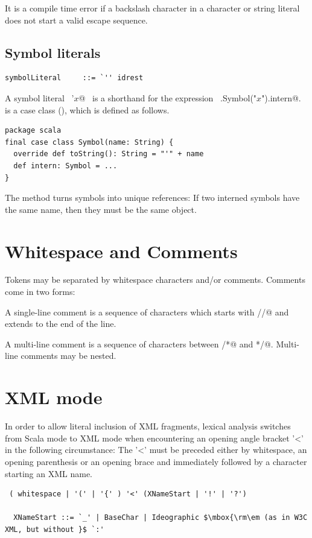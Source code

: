 It is a compile time error if a backslash character in a character or
string literal does not start a valid escape sequence.

\subsection{Symbol literals}

\syntax\begin{lstlisting}
symbolLiteral     ::= `'' idrest
\end{lstlisting}

A symbol literal ~\lstinline@'$x$@~ is a shorthand for the expression
~\lstinline@scala.Symbol("$x$").intern@. \lstinline@Symbol@ is a case class
(), which is defined as follows.
\begin{lstlisting}
package scala
final case class Symbol(name: String) {
  override def toString(): String = "'" + name
  def intern: Symbol = ...
}
\end{lstlisting}
The \lstinline@intern@ method turns symbols into unique references: If
two interned symbols have the same name, then they must be the same
object.

\section{Whitespace and Comments}

Tokens may be separated by whitespace characters
and/or comments. Comments come in two forms:

A single-line comment is a sequence of characters which starts with
\lstinline@//@ and extends to the end of the line.

A multi-line comment is a sequence of characters between \lstinline@/*@ and
\lstinline@*/@. Multi-line comments may be nested.

\section{XML mode\label{sec::xmlMode}}

In order to allow literal inclusion of XML fragments, lexical analysis
switches from Scala mode to XML mode when encountering an opening
angle bracket '<' in the following circumstance: The '<' must be
preceded either by whitespace, an opening parenthesis or an opening
brace and immediately followed by a character starting an XML name.

\syntax\begin{lstlisting}
 ( whitespace | '(' | '{' ) '<' (XNameStart | '!' | '?')

  XNameStart ::= `_' | BaseChar | Ideographic $\mbox{\rm\em (as in W3C XML, but without }$ `:'
\end{lstlisting}

